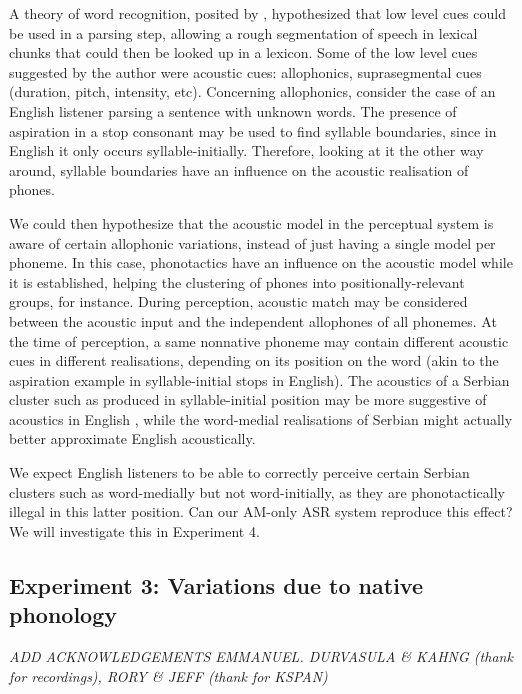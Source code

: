 {A theory of word recognition, posited by \cite{church1987}, hypothesized that low level cues could be used in a parsing step, allowing a rough segmentation of speech in lexical chunks that could then be looked up in a lexicon. Some of the low level cues suggested by the author were acoustic cues: allophonics, suprasegmental cues (duration, pitch, intensity, etc). Concerning allophonics, consider the case of an English listener parsing a sentence with unknown words. The presence of aspiration in a stop consonant may be used to find syllable boundaries, since in English it only occurs syllable-initially. Therefore, looking at it the other way around, syllable boundaries have an influence on the acoustic realisation of phones. 

We could then hypothesize that the acoustic model in the perceptual system is aware of certain allophonic variations, instead of just having a single model per phoneme. In this case, phonotactics have an influence on the acoustic model while it is established, helping the clustering of phones into positionally-relevant groups, for instance. During perception, acoustic match may be considered between the acoustic input and the independent allophones of all phonemes.
At the time of perception, a same nonnative phoneme may contain different acoustic cues in different realisations, depending on its position on the word (akin to the aspiration example in syllable-initial stops in English). The acoustics of a Serbian cluster such as  produced in syllable-initial position may be more suggestive of acoustics in English \textipa{[g@m]}, while the word-medial realisations of Serbian  might actually better approximate English \textipa{[gm]} acoustically.

We expect English listeners to be able to correctly perceive certain Serbian clusters such as  word-medially but not word-initially, as they are phonotactically illegal in this latter position. Can our AM-only ASR system reproduce this effect? We will investigate this in Experiment 4. 

\subsection{Experiment 3: Variations due to native phonology}
\small{\textit{{\color{red}ADD ACKNOWLEDGEMENTS EMMANUEL. DURVASULA \& KAHNG (thank for recordings), RORY \& JEFF (thank for KSPAN)}}}

}
